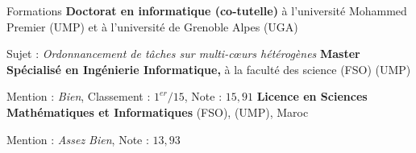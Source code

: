 \begin{rubric}{Formations}
    \entry*[$2016$ ]%
    \textbf{Doctorat en informatique (co-tutelle)} à l'université Mohammed Premier (UMP) et à l'université de Grenoble Alpes (UGA)
	\par Sujet : \emph{Ordonnancement de tâches sur multi-cœurs hétérogènes}
%
\entry*[$2014$]%
    \textbf{Master Spécialisé en Ingénierie Informatique,} à la faculté des science (FSO) (UMP)\par
	Mention : \emph{Bien}, Classement : $1^{er}/15$, Note : $15,91$ 
%
\entry*[$2012$]%
	\textbf{Licence en Sciences Mathématiques et Informatiques} (FSO), (UMP), Maroc \par
	Mention : \emph{Assez Bien}, Note :  $13,93$
%
%
%
\end{rubric}
